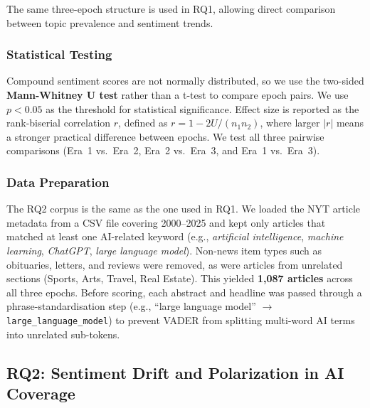 The same three-epoch structure is used in RQ1, allowing direct comparison
between topic prevalence and sentiment trends.

\subsubsection{Statistical Testing}

Compound sentiment scores are not normally distributed, so we use the
two-sided \textbf{Mann-Whitney U test} rather than a t-test to compare
epoch pairs. We use $p < 0.05$ as the threshold for statistical significance.
Effect size is reported as the rank-biserial correlation $r$, defined as
$r = 1 - 2U / (n_1 n_2)$, where larger $|r|$ means a stronger practical
difference between epochs. We test all three pairwise comparisons
(Era~1 vs.\ Era~2, Era~2 vs.\ Era~3, and Era~1 vs.\ Era~3).

\subsubsection{Data Preparation}

The RQ2 corpus is the same as the one used in RQ1. We loaded the NYT article
metadata from a CSV file covering 2000--2025 and kept only articles that
matched at least one AI-related keyword (e.g.,
\textit{artificial intelligence}, \textit{machine learning},
\textit{ChatGPT}, \textit{large language model}). Non-news item types such
as obituaries, letters, and reviews were removed, as were articles from
unrelated sections (Sports, Arts, Travel, Real Estate). This yielded
\textbf{1,087 articles} across all three epochs. Before scoring, each
abstract and headline was passed through a phrase-standardisation step
(e.g., ``large language model'' $\to$ \texttt{large\_language\_model}) to
prevent VADER from splitting multi-word AI terms into unrelated
sub-tokens.



\subsection{RQ2: Sentiment Drift and Polarization in AI Coverage}
\label{subsec:rq2-results}

